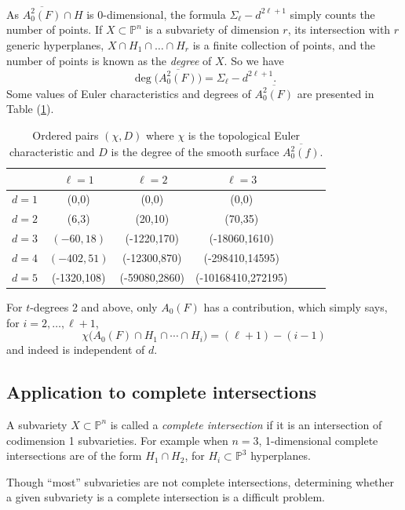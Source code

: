\documentclass[11pt]{article}
\theoremstyle{plain}
\theoremstyle{definition}
\theoremstyle{definition}
\begin{document}
As $\overline{A_0^2(F)}\cap H$ is 0-dimensional, the formula $\Sigma_\ell-d^{2\ell+1}$ simply counts the number of points. If $X\subset \mathbb P^n$ is a subvariety of dimension $r$, its intersection with $r$ generic hyperplanes, $X\cap H_1 \cap \dots \cap H_r$ is a finite collection of points, and the number of points is known as the \textit{degree} of $X$. So we have 
\[
\deg\big(\overline{A_0^2(F)}\big)=\Sigma_\ell-d^{2\ell+1}.
\]
Some values of Euler characteristics and degrees of $\overline{A_0^2(F)}$ are presented in Table (\ref{degrees}). 
\begin{table}
    \centering
    \begin{tabular}{|c|c|c|c|c|c|c|}
        \hline
         &$\ell=1$  &$\ell=2$  & $\ell=3$ \\\hline
         $d=1$&  (0,0)& (0,0) & (0,0)   \\\hline
         $d=2$&  (6,3)&  (20,10)&  (70,35)  \\\hline
         $d=3$&  $(-60,18)$&  (-1220,170)&(-18060,1610)     \\\hline
         $d=4$&  $(-402,51)$& (-12300,870) &  (-298410,14595)     \\\hline
         $d=5$&  (-1320,108)& (-59080,2860) &(-10168410,272195)       \\\hline
    \end{tabular}
    \caption{Ordered pairs $(\chi,D)$ where $\chi$ is the topological Euler characteristic and $D$ is the degree of the smooth surface $\overline{A_0^2(f)}$. }
    \label{degrees}
\end{table}

For $t$-degrees 2 and above, only $A_0(F)$ has a contribution, which simply says, for $i=2,\dots,\ell+1$,
\[
\chi\big(A_0(F)\cap H_1\cap\cdots\cap H_i\big) = (\ell+1)-(i-1)
\]
and indeed is independent of $d$. 

\subsection{Application to complete intersections}

A subvariety $X \subset \mathbb P^n$ is called a \textit{complete intersection} if it is an intersection of codimension 1 subvarieties. For example when $n=3$, 1-dimensional complete intersections are of the form $H_1\cap H_2$, for $H_i\subset \mathbb P^3$ hyperplanes. 

Though ``most'' subvarieties are not complete intersections, determining whether a given subvariety is a complete intersection is a difficult problem. 
\end{document}
